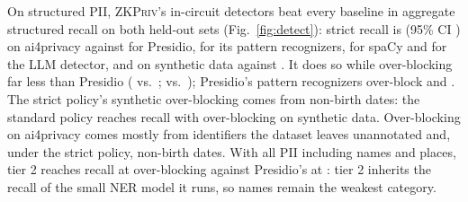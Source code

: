\documentclass[conference]{IEEEtran}
\newcommand{\sys}{\textsc{ZKPriv}}
\begin{document}
On structured PII, \sys{}'s in-circuit detectors beat every baseline in aggregate structured recall on both held-out sets (Fig.~\ref{fig:detect}): strict recall is \tAiStrictStruct{} (95\% CI \tAiStrictStructCI{}) on ai4privacy against \tAiPresStruct{} for Presidio, \tAiPresRxStruct{} for its pattern recognizers, \tAiSpacyStruct{} for spaCy and \tAiLlmStruct{} for the LLM detector, and \tSynStrictStruct{} on synthetic data against \tSynPresStruct{}. It does so while over-blocking far less than Presidio (\tAiStrictOver{} vs.\ \tAiPresOver{}; \tSynStrictOver{} vs.\ \tSynPresOver{}); Presidio's pattern recognizers over-block \tAiPresRxOver{} and \tSynPresRxOver{}. The strict policy's synthetic over-blocking comes from non-birth dates: the standard policy reaches \tSynStdStruct{} recall with \tSynStdOver{} over-blocking on synthetic data. Over-blocking on ai4privacy comes mostly from identifiers the dataset leaves unannotated and, under the strict policy, non-birth dates. With all PII including names and places, tier 2 reaches \tAiStrictTAll{} recall at \tAiStrictTOver{} over-blocking against Presidio's \tAiPresAll{} at \tAiPresOver{}: tier 2 inherits the recall of the small NER model it runs, so names remain the weakest category.
\end{document}
